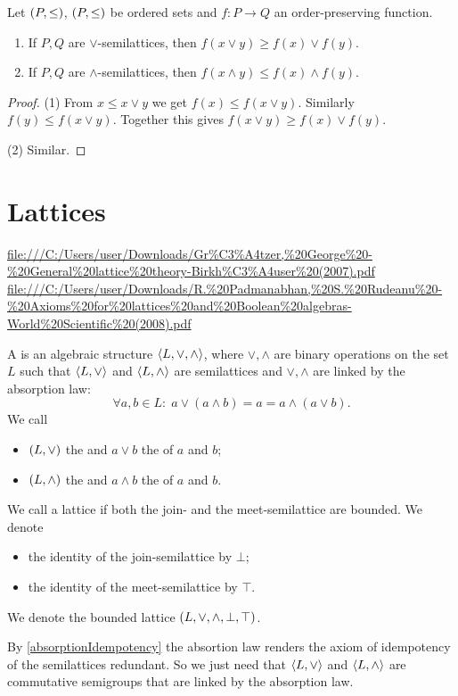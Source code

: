 \begin{lemma} \label{orderPreservingJoinMeet}
Let $\left( P,\leq \right)$, $\left( P,\leq \right)$ be ordered sets and $f: P\to Q$ an order-preserving function.
\begin{enumerate}
\item If $P,Q$ are $\vee$-semilattices, then $f(x\vee y) \geq f(x)\vee f(y)$.
\item If $P,Q$ are $\wedge$-semilattices, then $f(x\wedge y) \leq f(x)\wedge f(y)$.
\end{enumerate} 
\end{lemma}
\begin{proof}
(1) From $x \leq x\vee y$ we get $f(x) \leq f(x\vee y)$. Similarly $f(y) \leq f(x\vee y)$. Together this gives $f(x\vee y) \geq f(x)\vee f(y)$.

(2) Similar.
\end{proof}

\section{Lattices}
\url{file:///C:/Users/user/Downloads/Gr%C3%A4tzer,%20George%20-%20General%20lattice%20theory-Birkh%C3%A4user%20(2007).pdf}
\url{file:///C:/Users/user/Downloads/R.%20Padmanabhan,%20S.%20Rudeanu%20-%20Axioms%20for%20lattices%20and%20Boolean%20algebras-World%20Scientific%20(2008).pdf}
\begin{definition}
A  is an algebraic structure $\langle L,\vee, \wedge \rangle$, where $\vee, \wedge$ are binary operations on the set $L$ such that $\langle L,\vee \rangle$ and $\langle L,\wedge \rangle$ are semilattices and $\vee,\wedge$ are linked by the absorption law:
\[ \forall a,b\in L: \; a \vee (a \wedge b) = a = a \wedge (a\vee b). \]
We call
\begin{itemize}
\item $\left( L,\vee \right)$ the  and $a\vee b$ the  of $a$ and $b$;
\item $\left( L,\wedge \right)$ the  and $a\wedge b$ the  of $a$ and $b$.
\end{itemize}
We call a lattice  if both the join- and the meet-semilattice are bounded. We denote
\begin{itemize}
\item the identity of the join-semilattice by $\bot$;
\item the identity of the meet-semilattice by $\top$.
\end{itemize}
We denote the bounded lattice $\left( L, \vee, \wedge, \bot, \top \right)$.
\end{definition}
By \ref{absorptionIdempotency} the absortion law renders the axiom of  idempotency of the semilattices redundant. So we just need that $\langle L,\vee \rangle$ and $\langle L,\wedge \rangle$ are commutative semigroups that are linked by the absorption law.

